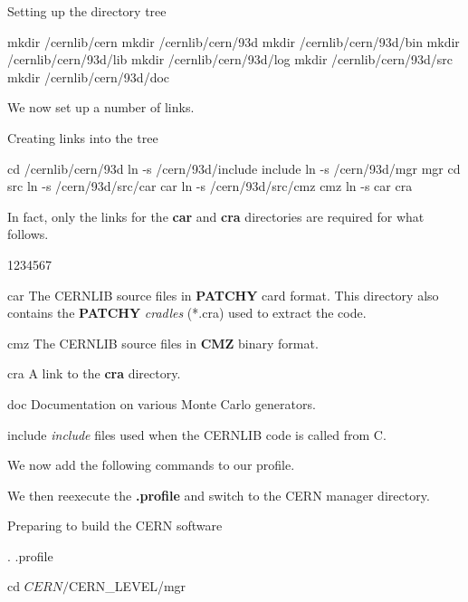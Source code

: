 \begin{XMPt}{Setting up the directory tree}

mkdir /cernlib/cern
mkdir /cernlib/cern/93d
mkdir /cernlib/cern/93d/bin
mkdir /cernlib/cern/93d/lib
mkdir /cernlib/cern/93d/log
mkdir /cernlib/cern/93d/src
mkdir /cernlib/cern/93d/doc
\end{XMPt}

We now set up a number of links.

\begin{XMPt}{Creating links into the \AFS{} tree}

cd /cernlib/cern/93d
ln -s /cern/93d/include include
ln -s /cern/93d/mgr mgr
cd src
ln -s /cern/93d/src/car car
ln -s /cern/93d/src/cmz cmz
ln -s car cra

\end{XMPt}

In fact, only the links for the {\bf car} and {\bf cra} directories are required
for what follows. 

\begin{DLtt}{1234567}
\item[car]The CERNLIB source files in {\bf PATCHY} card format. This
directory also contains the {\bf PATCHY} {\it cradles} (*.cra) used
to extract the code.
\item[cmz]The CERNLIB source files in {\bf CMZ} binary format.
\item[cra]A link to the {\bf cra} directory.
\item[doc]Documentation on various Monte Carlo generators.
\item[include]{\it include} files used when the CERNLIB code is called
from C.
\end{DLtt}

We now add the following commands to our profile.


We then reexecute the {\bf .profile} and switch to the CERN manager directory.

\begin{XMPt}{Preparing to build the CERN software}

. .profile

cd $CERN/$CERN_LEVEL/mgr

\end{XMPt}

